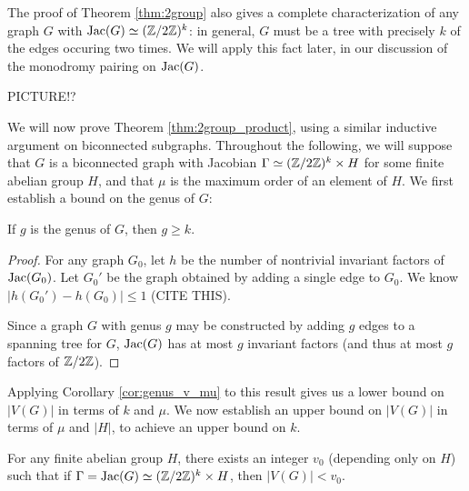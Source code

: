 \documentclass{amsart}
\begin{document}
\begin{remark}
  The proof of Theorem \ref{thm:2group} also gives a complete
  characterization of any graph $G$ with $\operatorname{Jac}(G) \simeq
  (\mathbb{Z}/2\mathbb{Z})^k$: in general, $G$ must be a tree with precisely $k$ of
  the edges occuring two times. We will apply this fact later, in our
  discussion of the monodromy pairing on $\operatorname{Jac}(G)$.
\end{remark}

PICTURE!?

We will now prove Theorem \ref{thm:2group_product}, using a similar
inductive argument on biconnected subgraphs. Throughout the following,
we will suppose that $G$ is a biconnected graph with Jacobian $\Gamma
\simeq (\mathbb{Z}/2\mathbb{Z})^k \times H$ for some finite abelian group $H$, and
that $\mu$ is the maximum order of an element of $H$. We first
establish a bound on the genus of $G$:

\begin{lem}
  \label{lem:genus_cycle}
  If $g$ is the genus of $G$, then $g \ge k$.
\end{lem}
\begin{proof}
  For any graph $G_0$, let $h$ be the number of nontrivial invariant
  factors of $\operatorname{Jac}(G_0)$. Let $G_0'$ be the graph obtained by adding a
  single edge to $G_0$. We know $|h(G_0') - h(G_0)| \le 1$ (CITE
  THIS). 

  Since a graph $G$ with genus $g$ may be constructed by adding $g$ edges
  to a spanning tree for $G$, $\operatorname{Jac}(G)$ has at most $g$ invariant
  factors (and thus at most $g$ factors of $\mathbb{Z}/2\mathbb{Z}$). 
\end{proof}

Applying Corollary \ref{cor:genus_v_mu} to this result gives us a
lower bound on $|V(G)|$ in terms of $k$ and $\mu$. We now establish an
upper bound on $|V(G)|$ in terms of $\mu$ and $|H|$, to achieve an
upper bound on $k$.

\begin{prop}
  \label{prop:v_bound}
  For any finite abelian group $H$, there exists an integer $v_0$
  (depending only on $H$) such that if $\Gamma = \operatorname{Jac}(G) \simeq (\mathbb{Z}/2\mathbb{Z})^k
  \times H$, then $|V(G)| < v_0$.
\end{prop}
\end{document}
